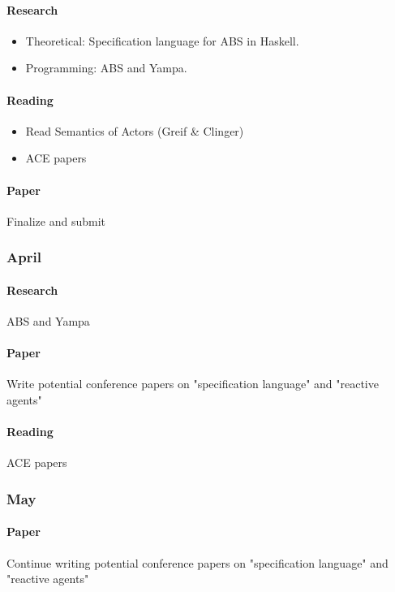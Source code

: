\paragraph{Research}
	\begin{itemize}
		\item Theoretical: Specification language for ABS in Haskell.
		\item Programming: ABS and Yampa.
	\end{itemize}
	
\paragraph{Reading}
	\begin{itemize}
		\item Read Semantics of Actors (Greif \& Clinger)
		\item ACE papers
	\end{itemize}
	
\paragraph{Paper} Finalize and submit

\subsubsection{April}
\paragraph{Research} ABS and Yampa
	
\paragraph{Paper} Write potential conference papers on "specification language" and "reactive agents"
	
\paragraph{Reading} ACE papers

\subsubsection{May}
\paragraph{Paper} Continue writing potential conference papers on "specification language" and "reactive agents"

